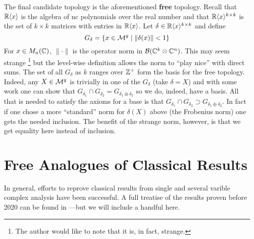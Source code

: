 The final candidate topology is the aforementioned \textbf{free} topology.
Recall that \(\mathbb{R} \langle x \rangle \) is the algebra of nc polynomials over the
real number and that
\(\mathbb{R} \langle x \rangle ^{k\times k}\) is the set of \(k \times k\) matrices
with entries in \(\mathbb{R} \langle x \rangle \). Let
\(\delta \in \mathbb{R} \langle x \rangle ^{k\times k}\) and define
\[
  G_\delta = \{x \in \mathcal{M}^{g} \mid \| \delta(x) \| <1\}
\]
For \(x \in M_n(\mathbb{C})\), \(\|\cdot \|\) is the operator norm in
\(\mathcal{B}(\mathbb{C}^k\otimes\mathbb{C}^n)\). This may seem strange
\footnote{The author would like to note that it is, in fact, strange.}
but the level-wise definition allows the norm to ``play nice'' with direct sums.
The set of all \(G_\delta\) as \(k\) ranges over \(\mathbb{Z} ^+\) form the basis for
the free topology. Indeed, any \(X \in \mathcal{M}^{g} \) is trivially in one of the
\(G_\delta\) (take \(\delta=X\)) and with some work one can show that
\(G_{\delta_1} \cap G_{\delta_2}= G_{\delta_1\oplus \delta_2}\) so we do,
indeed, have a basis. All that is needed to satisfy the axioms for a base is that
\(G_{\delta_1} \cap G_{\delta_2} \supset G_{\delta_1\oplus \delta_2}\). In
fact if one chose a more ``standard'' norm for \(\delta(X)\) above (\eg the
Frobenius norm) one gets the needed inclusion. The benefit of the strange norm,
however, is that we get equality here instead of inclusion.

\section{Free Analogues of Classical Results}%
\label{sec:freeanal}

In general, efforts to reprove classical results from single and several varible
complex analysis have been successful. A full treatise of the results proven
before 2020 can be found in \cite{aglerOperator2019}---but we will include a
handful here.

